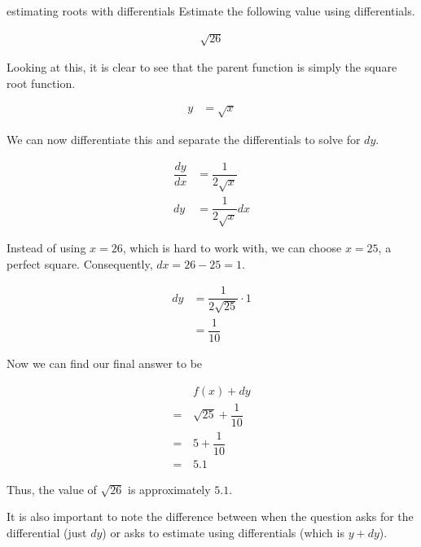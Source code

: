 \begin{example}{estimating roots with differentials}
    Estimate the following value using differentials.
    
    \begin{align*}
        \sqrt{26}
    \end{align*}
    
    \vspace{0.3cm}
    
    Looking at this, it is clear to see that the parent function is simply the square root function.
    
    \begin{align}
        y &= \sqrt{x}
    \end{align}
    
    We can now differentiate this and separate the differentials to solve for \( dy \).
    
    \begin{align}
        \dfrac{dy}{dx} &= \dfrac{1}{2\sqrt{x}} \\
        dy &= \dfrac{1}{2\sqrt{x}} dx
    \end{align}
    
    Instead of using \( x = 26 \), which is hard to work with, we can choose \( x = 25 \), a perfect square. Consequently, \( dx = 26 - 25 = 1 \).
    
    \begin{align}
        dy &= \dfrac{1}{2 \sqrt{25}} \cdot 1 \\
        &= \dfrac{1}{10}
    \end{align}
    
    Now we can find our final answer to be
    
    \begin{align}
        &f \left( x \right) + dy \\
        = \, &\sqrt{25} + \dfrac{1}{10} \\
        = \, &5 + \dfrac{1}{10} \\
        = \, &5.1
    \end{align}
    
    Thus, the value of \( \sqrt{26} \) is approximately \( 5.1 \).
\end{example}

It is also important to note the difference between when the question asks for the differential (just \( dy \)) or asks to estimate using differentials (which is \( y + dy \)).

